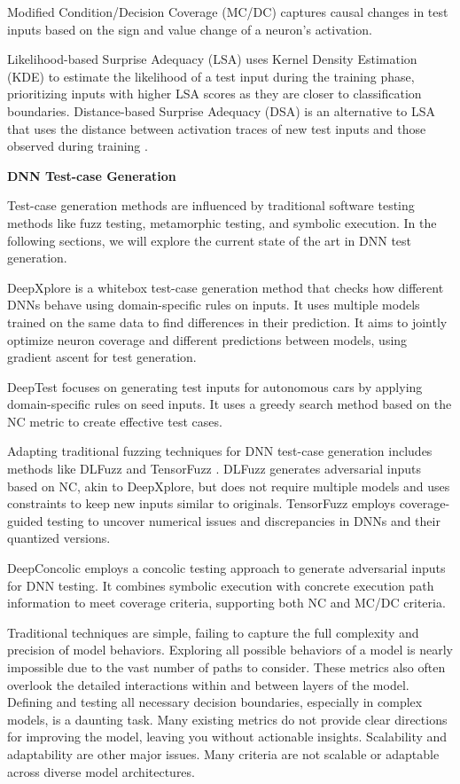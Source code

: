 Modified Condition/Decision Coverage (MC/DC) \cite{SunY} captures causal changes in test inputs based on the sign and value change of a neuron's activation.

Likelihood-based Surprise Adequacy (LSA) uses Kernel Density Estimation (KDE) to estimate the likelihood of a test input during the training phase, prioritizing inputs with higher LSA scores as they are closer to classification boundaries. Distance-based Surprise Adequacy (DSA) is an alternative to LSA that uses the distance between activation traces of new test inputs and those observed during training \cite{KimJ}.

\smallskip\noindent%
\textbf{DNN Test-case Generation}

Test-case generation methods are influenced by traditional software testing methods like fuzz testing, metamorphic testing, and symbolic execution. In the following sections, we will explore the current state of the art in DNN test generation.

DeepXplore \cite{deepxplore} is a whitebox test-case generation method that checks how different DNNs behave using domain-specific rules on inputs. It uses multiple models trained on the same data to find differences in their prediction. It aims to jointly optimize neuron coverage and different predictions between models, using gradient ascent for test generation.

DeepTest \cite{deeptest} focuses on generating test inputs for autonomous cars by applying domain-specific rules on seed inputs. It uses a greedy search method based on the NC metric to create effective test cases.

Adapting traditional fuzzing techniques for DNN test-case generation includes methods like DLFuzz \cite{dlfuzz} and TensorFuzz \cite{tensorfuzz}. DLFuzz generates adversarial inputs based on NC, akin to DeepXplore, but does not require multiple models and uses constraints to keep new inputs similar to originals. TensorFuzz employs coverage-guided testing to uncover numerical issues and discrepancies in DNNs and their quantized versions.

DeepConcolic \cite{deepconcolic} employs a concolic testing approach to generate adversarial inputs for DNN testing. It combines symbolic execution with concrete execution path information to meet coverage criteria, supporting both NC and MC/DC criteria.

Traditional techniques are simple, failing to capture the full complexity and precision of model behaviors. Exploring all possible behaviors of a model is nearly impossible due to the vast number of paths to consider. These metrics also often overlook the detailed interactions within and between layers of the model. Defining and testing all necessary decision boundaries, especially in complex models, is a daunting task. Many existing metrics do not provide clear directions for improving the model, leaving you without actionable insights. Scalability and adaptability are other major issues. Many criteria are not scalable or adaptable across diverse model architectures.

